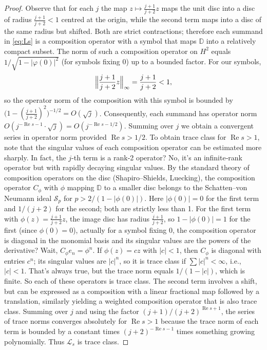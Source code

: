 \documentclass[11pt,a4paper]{article}
\begin{document}
\begin{proof}
Observe that for each \(j\) the map \(z\mapsto \frac{j+1}{j+2}z\) maps the unit disc into a disc of radius \(\frac{j+1}{j+2}<1\) centred at the origin, while the second term maps into a disc of the same radius but shifted.  Both are strict contractions; therefore each summand in \eqref{eq:Ls} is a composition operator with a symbol that maps \(\mathbb{D}\) into a relatively compact subset.  The norm of such a composition operator on \(H^2\) equals \(1/\sqrt{1-|\varphi(0)|^2}\) (for symbols fixing 0) up to a bounded factor.  For our symbols,
\[
\Bigl\|\frac{j+1}{j+2}z\Bigr\|_{\infty} = \frac{j+1}{j+2} < 1,
\]
so the operator norm of the composition with this symbol is bounded by \(\bigl(1-(\frac{j+1}{j+2})^2\bigr)^{-1/2} = O(\sqrt{j})\).  Consequently, each summand has operator norm \(O(j^{- \operatorname{Re}s - 1} \cdot \sqrt{j}) = O(j^{- \operatorname{Re}s - 1/2})\).  Summing over \(j\) we obtain a convergent series in operator norm provided \(\operatorname{Re}s > 1/2\).  To obtain trace class for \(\operatorname{Re}s>1\), note that the singular values of each composition operator can be estimated more sharply.  In fact, the \(j\)-th term is a rank‑2 operator? No, it's an infinite‑rank operator but with rapidly decaying singular values.  By the standard theory of composition operators on the disc (Shapiro–Shields, Luecking), the composition operator \(C_\phi\) with \(\phi\) mapping \(\mathbb{D}\) to a smaller disc belongs to the Schatten–von Neumann ideal \(\mathcal{S}_p\) for \(p>2/(1-|\phi(0)|)\).  Here \(|\phi(0)|=0\) for the first term and \(1/(j+2)\) for the second; both are strictly less than 1.  For the first term with \(\phi(z)=\frac{j+1}{j+2}z\), the image disc has radius \(\frac{j+1}{j+2}\), so \(1-|\phi(0)| = 1\) for the first (since \(\phi(0)=0\)), actually for a symbol fixing 0, the composition operator is diagonal in the monomial basis and its singular values are the powers of the derivative? Wait, \(C_\phi e_n = \phi^n\). If \(\phi(z)=c z\) with \(|c|<1\), then \(C_\phi\) is diagonal with entries \(c^n\); its singular values are \(|c|^n\), so it is trace class if \(\sum |c|^n < \infty\), i.e., \(|c|<1\). That's always true, but the trace norm equals \(1/(1-|c|)\), which is finite. So each of these operators is trace class. The second term involves a shift, but can be expressed as a composition with a linear fractional map followed by a translation, similarly yielding a weighted composition operator that is also trace class. Summing over \(j\) and using the factor \((j+1)/(j+2)^{\operatorname{Re}s+1}\), the series of trace norms converges absolutely for \(\operatorname{Re}s>1\) because the trace norm of each term is bounded by a constant times \((j+2)^{- \operatorname{Re}s - 1}\) times something growing polynomially. Thus \(\mathcal{L}_s\) is trace class.
\end{proof}
\end{document}
